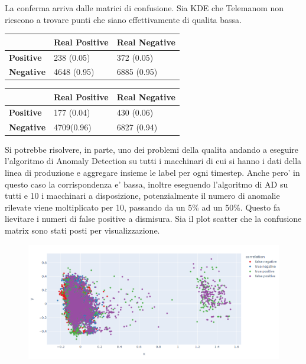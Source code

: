 La conferma arriva dalle matrici di confusione. Sia KDE che Telemanom non riescono a trovare punti che siano effettivamente di qualita bassa.

\begin{table}[]
\begin{tabular}{|l|l|l|}
\hline
                  & \textbf{Real Positive} & \textbf{Real Negative} \\ \hline
\textbf{Positive} & 238 (0.05)             & 372 (0.05)             \\ \hline
\textbf{Negative} & 4648 (0.95)            & 6885 (0.95)            \\ \hline
\end{tabular}
\end{table}

\begin{table}[]
\begin{tabular}{|l|l|l|}
\hline
                  & \textbf{Real Positive} & \textbf{Real Negative} \\ \hline
\textbf{Positive} & 177 (0.04)             & 430 (0.06)             \\ \hline
\textbf{Negative} & 4709(0.96)             & 6827 (0.94)            \\ \hline
\end{tabular}
\end{table}
Si potrebbe risolvere, in parte, uno dei problemi della qualita andando a eseguire l'algoritmo di Anomaly Detection su tutti i macchinari di cui si hanno i dati della linea di produzione e aggregare insieme le label per ogni timestep. Anche pero' in questo caso la corrispondenza e' bassa, inoltre eseguendo l'algoritmo di AD su tutti e 10 i macchinari a disposizione, potenzialmente il numero di anomalie rilevate viene moltiplicato per 10, passando da un 5\% ad un 50\%. Questo fa lievitare i numeri di false positive a dismisura. Sia il plot scatter che la confusione matrix sono stati posti per visualizzazione.

\begin{figure}[t]
\includegraphics[width=14cm, scale=1]{images/correlation_all_quality_plot.png}
\centering
\end{figure}

